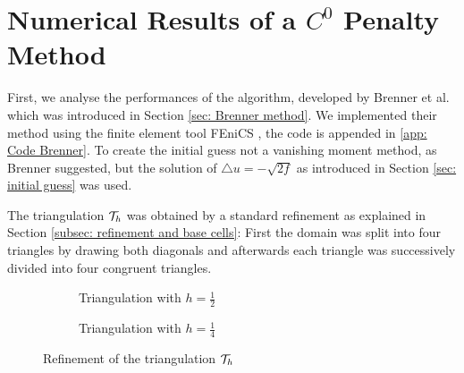 
\section{Numerical Results of a $C^0$ Penalty Method}\label{sec: numerical results brenner}



First, we analyse the performances of the algorithm, developed by Brenner et al. \cite{BGN+2011} which was introduced in Section \ref{sec: Brenner method}.
We implemented their method using the finite element tool FEniCS \cite{FEniCS}, the code is appended in \ref{app: Code Brenner}. 
To create the initial guess not a vanishing moment method, as Brenner suggested, but the solution of $\triangle u = -\sqrt{2f}$ as introduced in Section \ref{sec: initial guess} was used. 

The triangulation $\mathcal{T}_h$ was obtained by a standard refinement as explained in Section \ref{subsec: refinement and base cells}: First the domain was split into four triangles by drawing both diagonals and afterwards each triangle was successively divided into four congruent triangles.
\begin{figure}[H]
	\centering
	\begin{subfigure}{0.45\textwidth}
		\centering
		\edef \n {2}
		
		\caption{Triangulation with $h=\frac 1 2$}
		\label{fig: grid1}
	\end{subfigure}
	\begin{subfigure}{0.45\textwidth}
		\centering
		\edef \n {4}
		
		\caption{Triangulation with $h=\frac 1 4$}
		\label{fig: grid}
	\end{subfigure}	
	\caption{Refinement of the triangulation $\mathcal{T}_h$}
	\label{fig: grids}
\end{figure}

